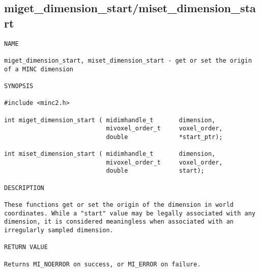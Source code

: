 \documentclass{article}
\begin{document}
\subsection{miget\_dimension\_start/miset\_dimension\_start}
\begin{verbatim}
NAME

miget_dimension_start, miset_dimension_start - get or set the origin
of a MINC dimension

SYNOPSIS

#include <minc2.h>

int miget_dimension_start ( midimhandle_t       dimension, 
                            mivoxel_order_t     voxel_order,
                            double              *start_ptr);

int miset_dimension_start ( midimhandle_t       dimension,
                            mivoxel_order_t     voxel_order,
                            double              start);

DESCRIPTION

These functions get or set the origin of the dimension in world
coordinates. While a "start" value may be legally associated with any
dimension, it is considered meaningless when associated with an
irregularly sampled dimension.   

RETURN VALUE

Returns MI_NOERROR on success, or MI_ERROR on failure.
\end{verbatim}
\end{document}
